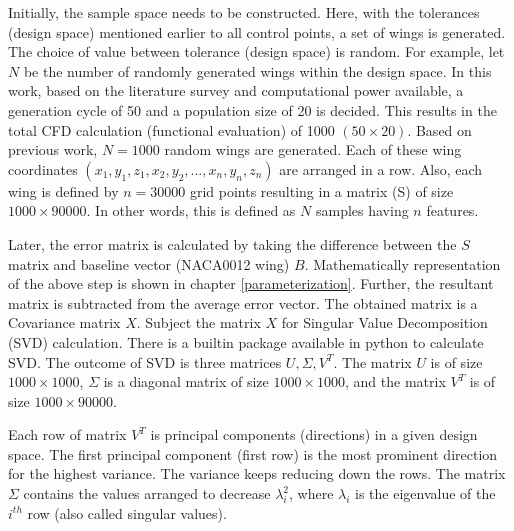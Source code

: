 Initially, the sample space needs to be constructed. Here, with the tolerances (design space) mentioned earlier to all control points, a set of wings is generated. The choice of value between tolerance (design space) is random. For example, let $N$ be the number of randomly generated wings within the design space. In this work, based on the literature survey and computational power available, a generation cycle of 50 and a population size of 20 is decided. This results in the total CFD calculation (functional evaluation) of 1000 $(50 \times 20)$. Based on previous work, $N=1000$ random wings are generated. Each of these wing coordinates $(x_1, y_1, z_1, x_2, y_2, ...,x_n, y_n, z_n)$ are arranged in a row. Also, each wing is defined by $n=30000$ grid points resulting in a matrix (S) of size $1000 \times 90000$. In other words, this is defined as $N$ samples having $n$ features.

Later, the error matrix is calculated by taking the difference between the $S$ matrix and baseline vector (NACA0012 wing) $B$. Mathematically representation of the above step is shown in chapter \ref{parameterization}. Further, the resultant matrix is subtracted from the average error vector. The obtained matrix is a Covariance matrix $X$. Subject the matrix  $X$ for Singular Value Decomposition (SVD) calculation. There is a builtin package available in python to calculate SVD. The outcome of SVD is three matrices $U, \Sigma, V^T$. The matrix $U$ is of size $1000 \times 1000$, $\Sigma$ is a diagonal matrix of size $1000 \times 1000$, and the matrix $V^T$ is of size $1000 \times 90000$.

Each row of matrix $V^T$ is principal components (directions) in a given design space. The first principal component (first row) is the most prominent direction for the highest variance. The variance keeps reducing down the rows. The matrix $ \Sigma $ contains the values arranged to decrease $\lambda_i^2$, where $\lambda_i$ is the eigenvalue of the $i^{th}$ row (also called singular values).
